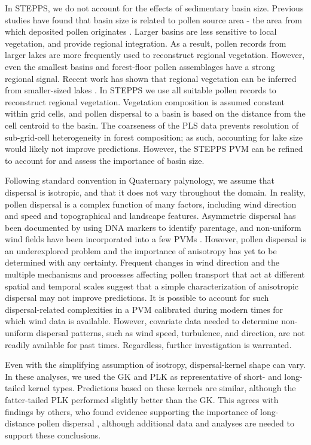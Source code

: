 \documentclass[12pt]{article}
\begin{document}
In STEPPS, we do not account for the effects of sedimentary basin
size. Previous studies have found that basin size is related to pollen
source area - the area from which deposited pollen originates
\citep{jacobson1981selection, prentice1985pollen,
  sugita1994pollen}. Larger basins are less sensitive to local
vegetation, and provide regional integration. As a result, pollen
records from larger lakes are more frequently used to reconstruct
regional vegetation. However, even the smallest basins
\citep{jackson1990} and forest-floor pollen assemblages
\citep{jackson1998quantitative, calcote1995pollen} have a strong
regional signal. Recent work has shown that regional vegetation can be
inferred from smaller-sized lakes \citep{trondmanpollen}. In STEPPS we
use all suitable pollen records to reconstruct regional
vegetation. Vegetation composition is assumed constant within grid
cells, and pollen dispersal to a basin is based on the distance from
the cell centroid to the basin. The coarseness of the PLS data
prevents resolution of sub-grid-cell heterogeneity in forest
composition; as such, accounting for lake size would likely not
improve predictions. However, the STEPPS PVM can be refined to account
for and assess the importance of basin size.

Following standard convention in Quaternary palynology, we assume that
dispersal is isotropic, and that it does not vary throughout the
domain. In reality, pollen dispersal is a complex function of many
factors, including wind direction and speed and topographical and
landscape features. Asymmetric dispersal has been documented by
\citet{robledo2005patterns} using DNA markers to identify parentage,
and non-uniform wind fields have been incorporated into a few PVMs
\citep{bunting2005modelling}. However, pollen dispersal is an
underexplored problem and the importance of anisotropy has yet to be
determined with any certainty. Frequent changes in wind direction and
the multiple mechanisms and processes affecting pollen transport that
act at different spatial and temporal scales suggest that a simple
characterization of anisotropic dispersal may not improve
predictions. It is possible to account for such dispersal-related
complexities in a PVM calibrated during modern times for which wind
data is available. However, covariate data needed to determine
non-uniform dispersal patterns, such as wind speed, turbulence, and direction, are
not readily available for past times. Regardless, further
investigation is warranted.

Even with the simplifying assumption of isotropy, dispersal-kernel
shape can vary. In these analyses, we used the GK and PLK as
representative of short- and long-tailed kernel types. Predictions
based on these kernels are similar, although the fatter-tailed PLK
performed slightly better than the GK. This agrees with findings by
others, who found evidence supporting the importance of long-distance
pollen dispersal \citep{austerlitz2004using, macinnis2012measuring},
although additional data and analyses are needed to support these
conclusions.
\end{document}
